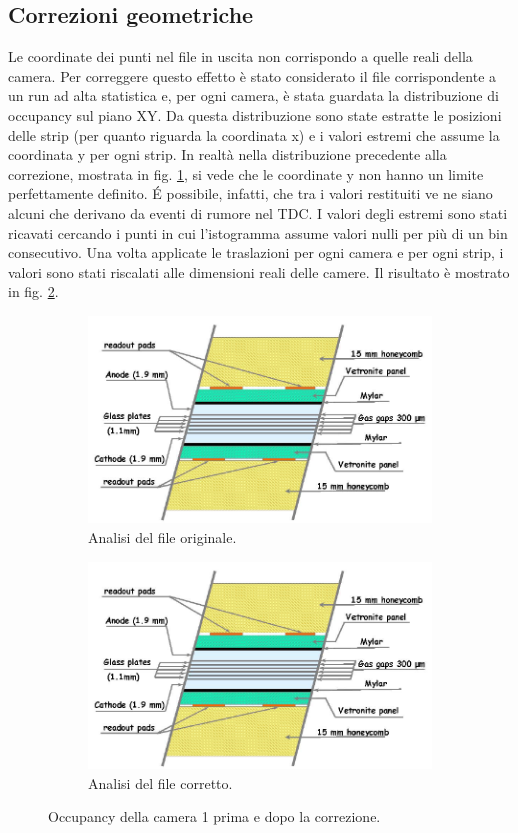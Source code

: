 \documentclass[8pt]{extarticle}
\begin{document}
\subsection{Correzioni geometriche} \label{subsec:corr_geom}
Le coordinate dei punti nel file in uscita non corrispondo a quelle reali della camera. Per correggere questo effetto è stato considerato il file corrispondente a un run ad alta statistica e, per ogni camera, è stata guardata la distribuzione di occupancy sul piano XY. Da questa distribuzione sono state estratte le posizioni delle strip (per quanto riguarda la coordinata x) e i valori estremi che assume la coordinata y per ogni strip. In realtà nella distribuzione precedente alla correzione, mostrata in fig. \ref{fig:disxy1_prima}, si vede che le coordinate y non hanno un limite perfettamente definito. \'E possibile, infatti, che tra i valori restituiti ve ne siano alcuni che derivano da eventi di rumore nel TDC. I valori degli estremi sono stati ricavati cercando i punti in cui l'istogramma assume valori nulli per più di un bin consecutivo. Una volta applicate le traslazioni per ogni camera e per ogni strip, i valori sono stati riscalati alle dimensioni reali delle camere. Il risultato è mostrato in fig. \ref{fig:disxy1_dopo}.

\begin{figure}
\centering
\begin{subfigure}{.5\textwidth}
  \centering
  \includegraphics[width=.6\linewidth]{mrpc}
  \caption{Analisi del file originale.}
  \label{fig:disxy1_prima}
\end{subfigure}%
\begin{subfigure}{.5\textwidth}
  \centering
  \includegraphics[width=.6\linewidth]{mrpc}
  \caption{Analisi del file corretto.}
  \label{fig:disxy1_dopo}
\end{subfigure}
\caption{Occupancy della camera 1 prima e dopo la correzione.}
\label{fig:disxy1}
\end{figure}
\end{document}
